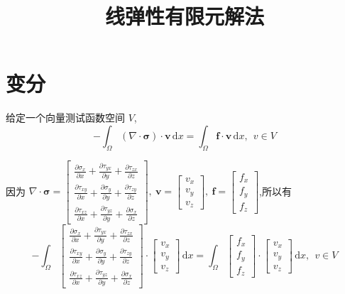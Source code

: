 \documentclass[12pt,a4paper]{article}
\title{线弹性有限元解法}
\date{\chntoday}
\begin{document}
\maketitle

\section{变分}

给定一个向量测试函数空间 $V$,
$$
-\int_{\Omega}^{} (\nabla\cdot\boldsymbol{\sigma})\cdot \boldsymbol{v}\, \mathrm{d}x=\int_{\Omega}^{} \boldsymbol{f}\cdot \boldsymbol{v}\, \mathrm{d}x, ~~ v\in V
$$

因为 $\nabla \cdot\boldsymbol{\sigma}=\begin{bmatrix}
\frac{\partial\sigma_x}{\partial x}+\frac{\partial\tau_{yx}}{\partial y}+\frac{\partial\tau_{zx}}{\partial z} \\
\frac{\partial\tau_{xy}}{\partial x}+\frac{\partial\sigma_{y}}{\partial y}+\frac{\partial\tau_{zy}}{\partial z} \\
\frac{\partial\tau_{xz}}{\partial x}+\frac{\partial\tau_{yz}}{\partial y}+\frac{\partial\sigma_{x}}{\partial z}
\end{bmatrix}, ~ \boldsymbol{v}=
\begin{bmatrix}
v_x \\
v_y \\
v_z
\end{bmatrix}, ~ \boldsymbol{f}=
\begin{bmatrix}
f_x \\
f_y \\
f_z
\end{bmatrix}$,所以有
$$
-\int_{\Omega}^{} \begin{bmatrix}
\frac{\partial\sigma_x}{\partial x}+\frac{\partial\tau_{yx}}{\partial y}+\frac{\partial\tau_{zx}}{\partial z} \\
\frac{\partial\tau_{xy}}{\partial x}+\frac{\partial\sigma_{y}}{\partial y}+\frac{\partial\tau_{zy}}{\partial z} \\
\frac{\partial\tau_{xz}}{\partial x}+\frac{\partial\tau_{yz}}{\partial y}+\frac{\partial\sigma_{x}}{\partial z}
\end{bmatrix}\cdot\begin{bmatrix}
v_x \\
v_y \\
v_z
\end{bmatrix}\, \mathrm{d}x=
\int_{\Omega}^{} \begin{bmatrix}
f_x \\
f_y \\
f_z
\end{bmatrix}\cdot \begin{bmatrix}
v_x \\
v_y \\
v_z
\end{bmatrix}\, \mathrm{d}x, ~~ v\in V
$$
\end{document}

